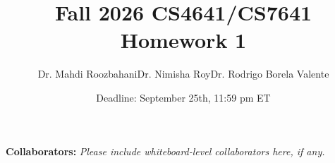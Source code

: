 \documentclass{article}
\title{Fall 2026 CS4641/CS7641 Homework 1}
\author{Dr. Mahdi Roozbahani\hspace{1cm}Dr. Nimisha Roy\hspace{1cm}Dr. Rodrigo Borela Valente}
\date{Deadline: September 25th, 11:59 pm ET}
\begin{document}
\maketitle

\textbf{Collaborators:} \textit{Please include whiteboard-level collaborators here, if any.}
\newpage


\newpage



\newpage


\newpage


\newpage


\newpage


\newpage


\newpage


\newpage


\newpage

\end{document}
